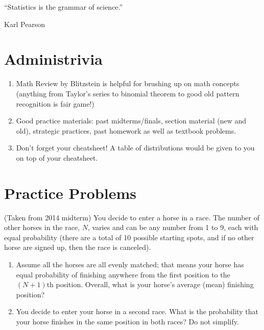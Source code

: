 \documentclass[11pt]{article}
\begin{document}

\setlength{\epigraphwidth}{.6\textwidth}
\epigraph{“Statistics is the grammar of science.”}{Karl Pearson}

\section*{Administrivia}
\begin{enumerate}
\item Math Review by Blitzstein is helpful for brushing up on math concepts (anything from Taylor's series to binomial theorem to good old pattern recognition is fair game!)

\item Good practice materials: past midterms/finals, section material (new and old), strategic practices, past homework as well as textbook problems.

\item Don't forget your cheatsheet! A table of distributions would be given to you on top of your cheatsheet.

\end{enumerate}

\section*{Practice Problems}
\begin{exercise}
(Taken from 2014 midterm) You decide to enter a horse in a race. The number of other horses in the race, $N$, varies and can be any number from 1 to 9, each with equal probability (there are a total of 10 possible starting spots, and if no other horse are signed up, then the race is canceled). \\

\begin{enumerate}
\item Assume all the horses are all evenly matched; that means your horse has equal probability of finishing anywhere from the first position to the $(N+1)$th position. Overall, what is your horse's average (mean) finishing position?

\item You decide to enter your horse in a second race. What is the probability that your horse finishes in the same position in both races? Do not simplify.

\end{enumerate}
\end{exercise}
\end{document}
